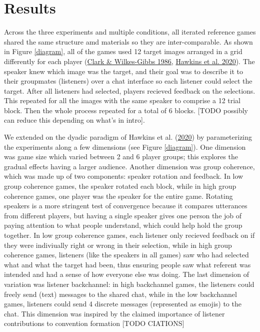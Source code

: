 \documentclass[
  english,
  a4paper,
]{article}
\begin{document}
\hypertarget{results}{%
\section{Results}\label{results}}

Across the three experiments and multiple conditions, all iterated reference games shared the same structure amd materials so they are inter-comparable. As shown in Figure \ref{diagram}, all of the games used 12 target images arranged in a grid differently for each player (\protect\hyperlink{ref-clarkReferringCollaborativeProcess1986}{Clark \& Wilkes-Gibbs 1986}, \protect\hyperlink{ref-hawkinsCharacterizingDynamicsLearning2020}{Hawkins et al. 2020}). The speaker knew which image was the target, and their goal was to describe it to their groupmates (listeners) over a chat interface so each listener could select the target. After all listeners had selected, players recieved feedback on the selections. This repeated for all the images with the same speaker to comprise a 12 trial block. Then the whole process repeated for a total of 6 blocks. {[}TODO possibly can reduce this depending on what's in intro{]}.

We extended on the dyadic paradigm of Hawkins et al. (\protect\hyperlink{ref-hawkinsCharacterizingDynamicsLearning2020}{2020}) by parameterizing the experiments along a few dimensions (see Figure \ref{diagram}). One dimension was game size which varied between 2 and 6 player groups; this explores the gradual effects having a larger audience. Another dimension was group coherence, which was made up of two components: speaker rotation and feedback. In low group coherence games, the speaker rotated each block, while in high group coherence games, one player was the speaker for the entire game. Rotating speakers is a more stringent test of convergence because it compares utterances from different players, but having a single speaker gives one person the job of paying attention to what people understand, which could help hold the group together. In low group coherence games, each listener only recieved feedback on if they were indiviually right or wrong in their selection, while in high group coherence games, listeners (like the speakers in all games) saw who had selected what and what the target had been, thus ensuring people saw what referent was intended and had a sense of how everyone else was doing. The last dimension of variation was listener backchannel: in high backchannel games, the listeners could freely send (text) messages to the shared chat, while in the low backchannel games, listeners could send 4 discrete messages (represented as emojis) to the chat. This dimension was inspired by the claimed importance of listener contributions to convention formation {[}TODO CIATIONS{]}
\end{document}
